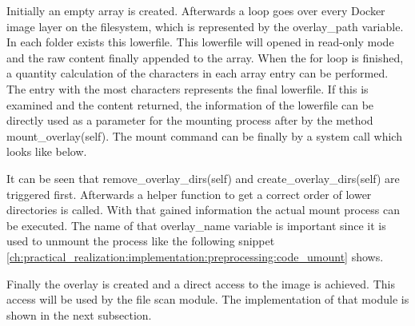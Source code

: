 
Initially an empty array is created. Afterwards a loop goes over every Docker image layer on the filesystem, which is represented by the overlay\_path variable.
In each folder exists this lowerfile. This lowerfile will opened in read-only mode and the raw content finally appended to the array. When the for loop is finished, a quantity calculation of the characters in each array entry can be performed. The entry with the most characters represents the final lowerfile.	
If this is examined and the content returned, the information of the lowerfile can be directly used as a parameter for the mounting process after by the method mount\_overlay(self).
The mount command can be finally by a system call which looks like below.

It can be seen that remove\_overlay\_dirs(self) and create\_overlay\_dirs(self) are triggered first. Afterwards a helper function to get a correct order of lower directories is called. With that gained information the actual mount process can be executed. The name of that overlay\_name variable is important since it is used to unmount the process like the following snippet \ref{ch:practical_realization:implementation:preprocessing:code_umount} shows.


Finally the overlay is created and a direct access to the image is achieved. This access will be used by the file scan module. The implementation of that module is shown in the next subsection.

